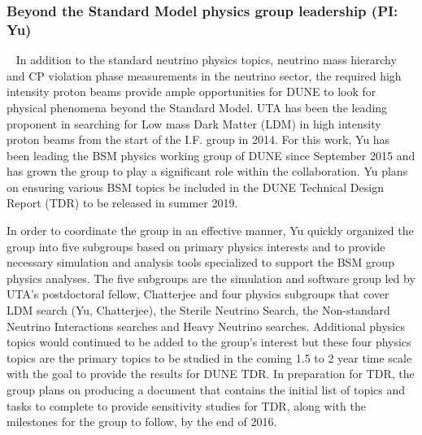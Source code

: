 %
%

%
%

%
%
\subsubsection {Beyond the Standard Model physics group leadership (PI: Yu)}~\label{sec:dune-bsm}
In addition to the standard neutrino physics topics, neutrino mass hierarchy and CP violation phase measurements in the neutrino sector, the required high intensity proton beams provide ample opportunities for DUNE to look for physical phenomena beyond the Standard Model. UTA has been the leading proponent in searching for Low mass Dark Matter (LDM) in high intensity proton beams from the start of the I.F. group in 2014. For this work, Yu has been leading the BSM physics working group of DUNE since September 2015 and has grown the group to play a significant role within the collaboration. Yu plans on ensuring various BSM topics be included in the DUNE Technical Design Report (TDR) to be released in summer 2019.

In order to coordinate the group in an effective manner, Yu quickly organized the group into five subgroups based on primary physics interests and to provide necessary simulation and analysis tools specialized to support the BSM group physics analyses.
The five subgroups are the simulation and software group led by UTA's postdoctoral fellow, Chatterjee and four physics subgroups that cover LDM search (Yu, Chatterjee), the Sterile Neutrino Search, the Non-standard Neutrino Interactions searches and Heavy Neutrino searches. Additional physics topics would continued to be added to the group's interest but these four physics topics are the primary topics to be studied in the coming 1.5 to 2 year time scale with the goal to provide the results for DUNE TDR.
In preparation for TDR, the group plans on producing a document that contains the initial list of topics and tasks to complete to provide
sensitivity studies for TDR, along with the milestones for the group to follow, by the end of 2016. 
%
%
